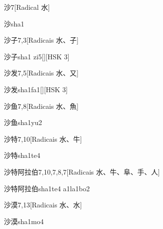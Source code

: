 \begin{entry}{沙}{7}[Radical ⽔]
  \begin{phonetics}{沙}{sha1}
  \end{phonetics}
\end{entry}

\begin{entry}{沙子}{7,3}[Radicais ⽔、⼦]
  \begin{phonetics}{沙子}{sha1 zi5}[][HSK 3]
  \end{phonetics}
\end{entry}

\begin{entry}{沙发}{7,5}[Radicais ⽔、⼜]
  \begin{phonetics}{沙发}{sha1fa1}[][HSK 3]
  \end{phonetics}
\end{entry}

\begin{entry}{沙鱼}{7,8}[Radicais ⽔、⿂]
  \begin{phonetics}{沙鱼}{sha1yu2}
  \end{phonetics}
\end{entry}

\begin{entry}{沙特}{7,10}[Radicais ⽔、⽜]
  \begin{phonetics}{沙特}{sha1te4}
  \end{phonetics}
\end{entry}

\begin{entry}{沙特阿拉伯}{7,10,7,8,7}[Radicais ⽔、⽜、⾩、⼿、⼈]
  \begin{phonetics}{沙特阿拉伯}{sha1te4 a1la1bo2}
  \end{phonetics}
\end{entry}

\begin{entry}{沙漠}{7,13}[Radicais ⽔、⽔]
  \begin{phonetics}{沙漠}{sha1mo4}
  \end{phonetics}
\end{entry}


